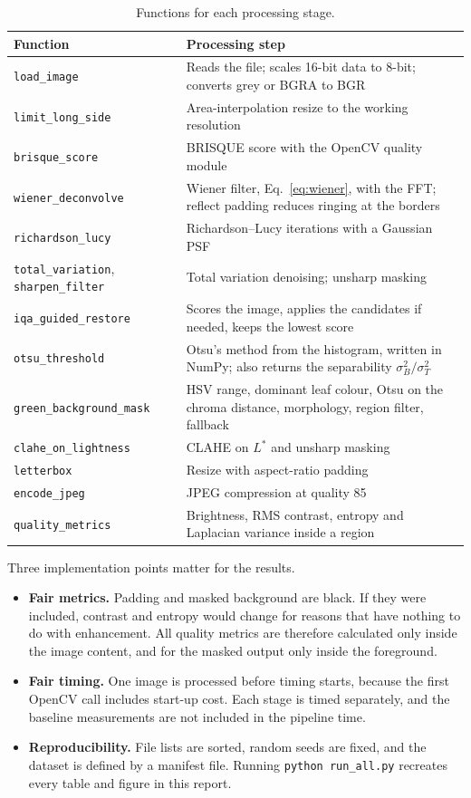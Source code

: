 \documentclass[12pt,a4paper]{article}
\begin{document}
\begin{table}[H]
\centering
\caption{Functions for each processing stage.}
\label{tab:functions}
\small
\begin{tabular}{p{4.6cm}p{10.4cm}}
\toprule
Function & Processing step \\
\midrule
\texttt{load\_image} & Reads the file; scales 16-bit data to 8-bit; converts grey or BGRA to BGR \\
\texttt{limit\_long\_side} & Area-interpolation resize to the working resolution \\
\texttt{brisque\_score} & BRISQUE score with the OpenCV quality module \\
\texttt{wiener\_deconvolve} & Wiener filter, Eq.~\eqref{eq:wiener}, with the FFT; reflect padding reduces ringing at the borders \\
\texttt{richardson\_lucy} & Richardson--Lucy iterations with a Gaussian PSF \\
\texttt{total\_variation}, \texttt{sharpen\_filter} & Total variation denoising; unsharp masking \\
\texttt{iqa\_guided\_restore} & Scores the image, applies the candidates if needed, keeps the lowest score \\
\texttt{otsu\_threshold} & Otsu's method from the histogram, written in NumPy; also returns the separability $\sigma_B^2/\sigma_T^2$ \\
\texttt{green\_background\_mask} & HSV range, dominant leaf colour, Otsu on the chroma distance, morphology, region filter, fallback \\
\texttt{clahe\_on\_lightness} & CLAHE on $L^*$ and unsharp masking \\
\texttt{letterbox} & Resize with aspect-ratio padding \\
\texttt{encode\_jpeg} & JPEG compression at quality 85 \\
\texttt{quality\_metrics} & Brightness, RMS contrast, entropy and Laplacian variance inside a region \\
\bottomrule
\end{tabular}
\end{table}

Three implementation points matter for the results.
\begin{itemize}[nosep]
\item \textbf{Fair metrics.} Padding and masked background are black. If they were included, contrast and entropy would change for reasons that have nothing to do with enhancement. All quality metrics are therefore calculated only inside the image content, and for the masked output only inside the foreground.
\item \textbf{Fair timing.} One image is processed before timing starts, because the first OpenCV call includes start-up cost. Each stage is timed separately, and the baseline measurements are not included in the pipeline time.
\item \textbf{Reproducibility.} File lists are sorted, random seeds are fixed, and the dataset is defined by a manifest file. Running \texttt{python run\_all.py} recreates every table and figure in this report.
\end{itemize}
\end{document}
